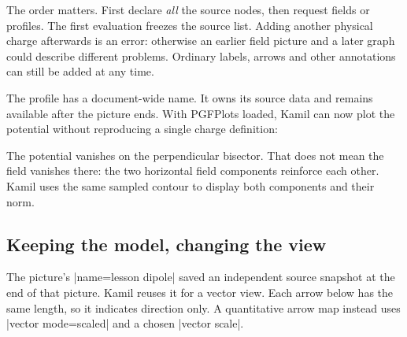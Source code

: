 The order matters. First declare \emph{all} the source nodes, then request
fields or profiles. The first evaluation freezes the source list. Adding another
physical charge afterwards is an error: otherwise an earlier field picture and
a later graph could describe different problems. Ordinary labels, arrows and
other annotations can still be added at any time.

The profile has a document-wide name. It owns its source data and remains
available after the picture ends. With PGFPlots loaded, Kamil can now plot the
potential without reproducing a single charge definition:

\begin{codeexample}[width=0pt]
\begin{tikzpicture}
  \begin{axis}[width=9cm,height=5cm,no markers,grid=major,
    xlabel={$x$ (cm)},ylabel={$V$ (V)}]
    \femmelectricplot[profile=above dipole,component=V,abscissa=x,
      plot options={blue!70!black,thick}]
  \end{axis}
\end{tikzpicture}
\end{codeexample}

The potential vanishes on the perpendicular bisector. That does not mean the
field vanishes there: the two horizontal field components reinforce each other.
Kamil uses the same sampled contour to display both components and their norm.

\begin{codeexample}[width=0pt]
\end{codeexample}

\subsection{Keeping the model, changing the view}
The picture's |name=lesson dipole| saved an independent source snapshot at the
end of that picture. Kamil reuses it for a vector view. Each arrow below has the
same length, so it indicates direction only. A quantitative arrow map instead
uses |vector mode=scaled| and a chosen |vector scale|.


